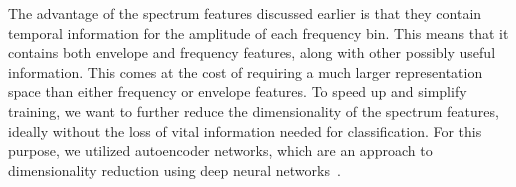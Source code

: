 \documentclass[\main/thesis.tex]{subfiles}
\begin{document}
% 
The advantage of the spectrum features discussed earlier is that they contain temporal information for the amplitude of each frequency bin. This means that it contains both envelope and frequency features, along with other possibly useful information. This comes at the cost of requiring a much larger representation space than either frequency or envelope features. To speed up and simplify training, we want to further reduce the dimensionality of the spectrum features, ideally without the loss of vital information needed for classification. For this purpose, we utilized autoencoder networks, which are an approach to dimensionality reduction using deep neural networks~\cite{hinton1994autoencoders,hinton2006reducing}. 
\end{document}
